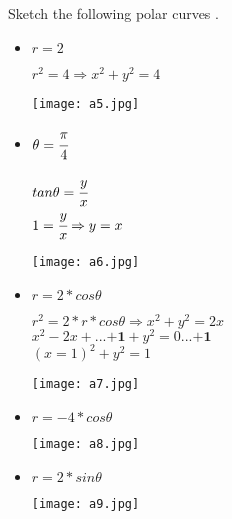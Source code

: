 \begin{example}
Sketch the following polar curves .
\begin{itemize}
    \item $ r=2$
    \begin{minipage}{0.5\textwidth}  
    $r^2=4 \Rightarrow x^2+y^2=4$
\end{minipage}
\begin{minipage}{0.5\textwidth}
\texttt{[image: a5.jpg]}
\end{minipage}
    \item $ \theta=\cfrac{\pi}{4}$\\
    \begin{minipage}{0.6\textwidth}
      $tan\theta=\cfrac{y}{x}$\\
      $1=\cfrac{y}{x} \Rightarrow y=x$
\end{minipage}
 \begin{minipage}{0.5\textwidth}
\texttt{[image: a6.jpg]}
\end{minipage}
\item  $r=2*cos\theta$\\
\begin{minipage}{0.6\textwidth}
$r^2=2*r*cos\theta \Rightarrow x^2+y^2=2x$ \\$x^2-2x+...\textbf{+1}+y^2=0 ...\textbf{+1}$ \\$(x=1)^2+y^2=1$
\end{minipage}
\begin{minipage}{0.5\textwidth}
\texttt{[image: a7.jpg]}
\end{minipage}
\item 
\begin{minipage}{0.6\textwidth}
$r=-4*cos\theta$
\end{minipage}
\begin{minipage}{0.5\textwidth}
\texttt{[image: a8.jpg]}\\
\end{minipage}
\item 
\begin{minipage}{0.6\textwidth}
$r=2*sin\theta$
\end{minipage}
\begin{minipage}{0.5\textwidth}
\texttt{[image: a9.jpg]}\\

\end{minipage}
\end{itemize}
\end{example}
